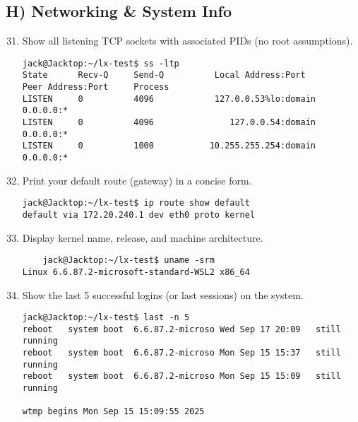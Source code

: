 \subsection*{H) Networking \& System Info}
\begin{enumerate}
  \setcounter{enumi}{30}
  \item Show all listening TCP sockets with associated PIDs (no root assumptions).
\begin{verbatim}
jack@Jacktop:~/lx-test$ ss -ltp
State      Recv-Q     Send-Q          Local Address:Port            Peer Address:Port     Process
LISTEN     0          4096            127.0.0.53%lo:domain               0.0.0.0:*
LISTEN     0          4096               127.0.0.54:domain               0.0.0.0:*
LISTEN     0          1000           10.255.255.254:domain               0.0.0.0:*
    \end{verbatim}
  \item Print your default route (gateway) in a concise form.
\begin{verbatim}
jack@Jacktop:~/lx-test$ ip route show default
default via 172.20.240.1 dev eth0 proto kernel
    \end{verbatim}
  \item Display kernel name, release, and machine architecture.
\begin{verbatim}
    jack@Jacktop:~/lx-test$ uname -srm
Linux 6.6.87.2-microsoft-standard-WSL2 x86_64
    \end{verbatim}
  \item Show the last 5 successful logins (or last sessions) on the system.
\begin{verbatim}
jack@Jacktop:~/lx-test$ last -n 5
reboot   system boot  6.6.87.2-microso Wed Sep 17 20:09   still running
reboot   system boot  6.6.87.2-microso Mon Sep 15 15:37   still running
reboot   system boot  6.6.87.2-microso Mon Sep 15 15:09   still running

wtmp begins Mon Sep 15 15:09:55 2025
    \end{verbatim}
\end{enumerate}

